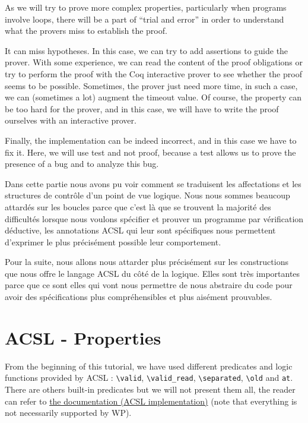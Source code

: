 \documentclass[12pt,francais,]{scrbook}
\begin{document}
As we will try to prove more complex properties, particularly when
programs involve loops, there will be a part of ``trial and error'' in
order to understand what the provers miss to establish the proof.

It can miss hypotheses. In this case, we can try to add assertions to
guide the prover. With some experience, we can read the content of the
proof obligations or try to perform the proof with the Coq interactive
prover to see whether the proof seems to be possible. Sometimes, the
prover just need more time, in such a case, we can (sometimes a lot)
augment the timeout value. Of course, the property can be too hard for
the prover, and in this case, we will have to write the proof ourselves
with an interactive prover.

Finally, the implementation can be indeed incorrect, and in this case we
have to fix it. Here, we will use test and not proof, because a test
allows us to prove the presence of a bug and to analyze this bug.

Dans cette partie nous avons pu voir comment se traduisent les
affectations et les structures de contrôle d'un point de vue logique.
Nous nous sommes beaucoup attardés sur les boucles parce que c'est là
que se trouvent la majorité des difficultés lorsque nous voulons
spécifier et prouver un programme par vérification déductive, les
annotations ACSL qui leur sont spécifiques nous permettent d'exprimer le
plus précisément possible leur comportement.

Pour la suite, nous allons nous attarder plus précisément sur les
constructions que nous offre le langage ACSL du côté de la logique.
Elles sont très importantes parce que ce sont elles qui vont nous
permettre de nous abstraire du code pour avoir des spécifications plus
compréhensibles et plus aisément prouvables.

\chapter{ACSL - Properties}\label{acsl---properties}

From the beginning of this tutorial, we have used different predicates
and logic functions provided by ACSL : \texttt{\textbackslash{}valid},
\texttt{\textbackslash{}valid\_read},
\texttt{\textbackslash{}separated}, \texttt{\textbackslash{}old} and
\texttt{at}. There are others built-in predicates but we will not
present them all, the reader can refer to
\href{http://frama-c.com/download.html}{the documentation (ACSL
implementation)} (note that everything is not necessarily supported by
WP).
\end{document}
